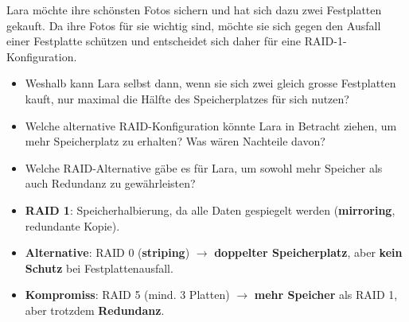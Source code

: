 \begin{myexercise}
	Lara möchte ihre schönsten Fotos sichern und hat sich dazu zwei Festplatten gekauft. Da ihre Fotos für sie wichtig sind, möchte sie sich gegen den Ausfall einer Festplatte schützen und entscheidet sich daher für eine RAID-1-Konfiguration.

	\begin{itemize}
		\item Weshalb kann Lara selbst dann, wenn sie sich zwei gleich grosse Festplatten kauft, nur maximal die Hälfte des Speicherplatzes für sich nutzen?
		\item Welche alternative RAID-Konfiguration könnte Lara in Betracht ziehen, um mehr Speicherplatz zu erhalten? Was wären Nachteile davon?
		\item Welche RAID-Alternative gäbe es für Lara, um sowohl mehr Speicher als auch Redundanz zu gewährleisten?
	\end{itemize}


	\begin{myanswer}
		\begin{itemize}
			\item \textbf{RAID 1}: Speicherhalbierung, da alle Daten gespiegelt werden (\textbf{mirroring}, redundante Kopie).
			\item \textbf{Alternative}: RAID 0 (\textbf{striping}) \(\rightarrow\) \textbf{doppelter Speicherplatz}, aber \textbf{kein Schutz} bei Festplattenausfall.
			\item \textbf{Kompromiss}: RAID 5 (mind. 3 Platten) \(\rightarrow\) \textbf{mehr Speicher} als RAID 1, aber trotzdem \textbf{Redundanz}.
		\end{itemize}
	\end{myanswer}
\end{myexercise}

